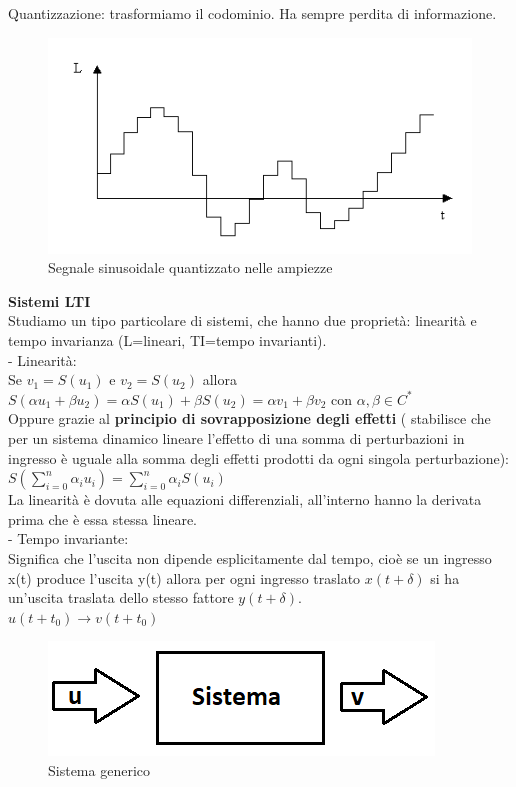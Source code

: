 \pagebreak
Quantizzazione: trasformiamo il codominio. Ha sempre perdita di informazione.\\

\begin{figure}[h]
	\centering
	\includegraphics[width=0.7\linewidth]{immagini/quantizzato}
	\caption{ Segnale sinusoidale quantizzato nelle ampiezze}
	\label{fig:quantizzato}
\end{figure}

\textbf{Sistemi LTI}\\
Studiamo un tipo particolare di sistemi, che hanno due proprietà: linearità e tempo invarianza (L=lineari, TI=tempo invarianti).\\
- Linearità:\\
Se $ v_{1}=S(u_{1}) $ e $ v_{2}=S(u_{2})  $ 
allora $ S(\alpha u_{1} + \beta u_{2}) 
= \alpha S(u_{1}) + \beta S(u_{2})
= \alpha v_{1} + \beta v_{2} $ con $ \alpha , \beta \in C^{*} $ \\
Oppure grazie al \textbf{principio di sovrapposizione degli effetti} ( stabilisce che per un sistema dinamico lineare l'effetto di una somma di perturbazioni in ingresso è uguale alla somma degli effetti prodotti da ogni singola perturbazione): \\
$ S( \sum_{i=0}^n \alpha_i u_i ) 
=  \sum_{i=0}^n \alpha_i S( u_i )
$ \\
La linearità è dovuta alle equazioni differenziali, all'interno hanno la derivata prima che è essa stessa lineare.\\
- Tempo invariante:\\
 Significa che l'uscita non dipende esplicitamente dal tempo, cioè se un ingresso x(t) produce l'uscita y(t) allora per ogni ingresso traslato $x(t+ \delta )$ si ha un'uscita traslata dello stesso fattore $y(t+ \delta )$.\\
 
 $u(t+ t_0 ) \rightarrow v(t+ t_0 )$
 
\begin{figure}[h]
	\centering
	\includegraphics[width=0.7\linewidth]{immagini/sistema2}
	\caption{ Sistema generico }
	\label{fig:sistema2}
\end{figure}

